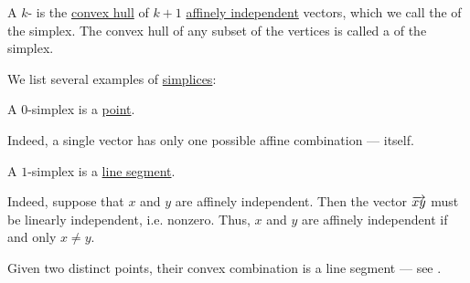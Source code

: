 \begin{definition}\label{def:simplex}
  A \( k \)- is the \hyperref[def:convex_hull]{convex hull} of \( k + 1 \) \hyperref[def:affine_dependence]{affinely independent} vectors, which we call the  of the simplex. The convex hull of any subset of the vertices is called a  of the simplex.
\end{definition}

\begin{example}\label{ex:def:simplex}
  We list several examples of \hyperref[def:simplex]{simplices}:
  \begin{thmenum}
     A \( 0 \)-simplex is a \hyperref[rem:point]{point}.

    Indeed, a single vector has only one possible affine combination --- itself.

     A \( 1 \)-simplex is a \hyperref[def:line_segment]{line segment}.

    Indeed, suppose that \( x \) and \( y \) are affinely independent. Then the vector \( \overrightarrow{xy} \) must be linearly independent, i.e. nonzero. Thus, \( x \) and \( y \) are affinely independent if and only \( x \neq y \).

    Given two distinct points, their convex combination is a line segment --- see .
  \end{thmenum}
\end{example}
